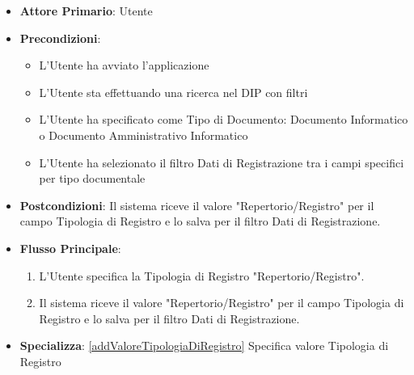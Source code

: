 \begin{itemize}
      \item \textbf{Attore Primario}: Utente
      \item \textbf{Precondizioni}: 
      \begin{itemize}            
            \item L'Utente ha avviato l'applicazione
            \item L'Utente sta effettuando una ricerca nel DIP con filtri
            \item L'Utente ha specificato come Tipo di Documento: Documento Informatico o Documento Amministrativo Informatico
            \item L'Utente ha selezionato il filtro Dati di Registrazione tra i campi specifici per tipo documentale
      \end{itemize}
      \item \textbf{Postcondizioni}: Il sistema riceve il valore "Repertorio/Registro" per il campo Tipologia di Registro e lo salva per il filtro Dati di Registrazione.
      \item \textbf{Flusso Principale}:
      \begin{enumerate}
            \item L'Utente specifica la Tipologia di Registro "Repertorio/Registro".
            \item Il sistema riceve il valore "Repertorio/Registro" per il campo Tipologia di Registro e lo salva per il filtro Dati di Registrazione.
      \end{enumerate}
      \item \textbf{Specializza}: \ref{addValoreTipologiaDiRegistro} Specifica valore Tipologia di Registro
\end{itemize}

